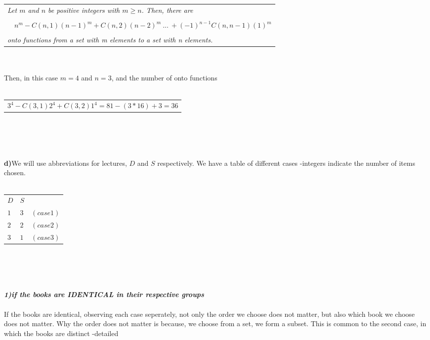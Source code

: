 \documentclass[12pt]{article}
\begin{document}
\\ \\
\begin{tabular}{l}
    \textit{Let $m$ and $n$ be positive integers with $m \geq n$. Then, there are}\\ \\
    \textit{$\quad n^m-C(n,1)(n-1)^m+C(n,2)(n-2)^m\ ...\ +(-1)^{n-1}C(n,n-1)(1)^m $}\\ \\
    \textit{onto functions from a set with m elements to a set with n elements.}\\
\end{tabular}
\\ \\
Then, in this case $m=4$ and $n=3$, and the number of onto functions
\\ \\
\begin{tabular}{l}
    $3^4-C(3,1)2^4+C(3,2)1^4=81-(3*16)+3=36$\\
\end{tabular}
\\ \\ \\ \\
\textbf{d)}We will use abbreviations for lectures, $D$ and $S$ respectively. We have a
table of different cases -integers indicate the number of items chosen.
\\ \\
\begin{tabular}{|l|l|l}
    \cline{1-2}
    $D$ & $S$ & \\
    \cline{1-2}
    $1$ & $3$ & $(case 1)$\\
    \cline{1-2}
    $2$ & $2$ & $(case 2)$\\
    \cline{1-2}
    $3$ & $1$ & $(case 3)$\\
    \cline{1-2}
\end{tabular}
\\ \\ \\ \\
\textbf{\textit{1)if the books are \emph{IDENTICAL} in their respective groups}}
\\ \\
If the books are identical, observing each case seperately, not only the order we choose does not matter, 
but also which book we choose does not matter. Why the order does not matter is because, we choose from 
a set, we form a subset. This is common to the second case, in which the books are distinct -detailed 
\end{document}
